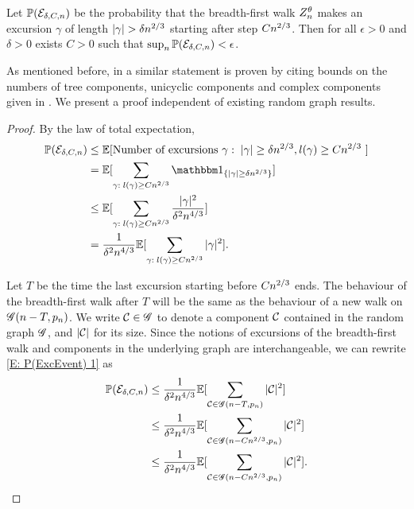 \begin{lemma} \label{L: late excursions}
	Let 
	$\mathbb{P}(\mathcal{E}_{\delta, C, n})$ 
	be the probability that the breadth-first walk $Z_n^{\theta}$ makes an excursion $\gamma$ of length 
	$|\gamma| > \delta n^{2 / 3}$ starting after step $Cn^{2 / 3}$.
	Then for all $\epsilon>0$ and $\delta > 0$ exists $C>0$ such that $\sup_n \mathbb{P}(\mathcal{E}_{\delta, C, n}) < \epsilon$. 
\end{lemma}
\begin{note}
	As mentioned before, in \cite[Lemma 9, p.826]{Aldous.1997} a similar statement is proven
	by citing bounds on the numbers of tree components, unicyclic components and complex components
	given in \cite{Luczak.1994}.
	We present a proof independent of existing random graph results.
\end{note}

\begin{proof}
	By the law of total expectation,
	\begin{equation} \label{E: P(ExcEvent) 1}
	\begin{aligned}
	\Prob(\ExcursionEvent) 
	&\leq \Exp{ \text{Number of excursions $\gamma: \; |\gamma| \geq \delta\n{2}{3},l(\gamma) \geq C\n{2}{3}$ } } \\
	&= \Exp{ \sum_{\gamma: \; l(\gamma) \geq C\n{2}{3}} \Ind{\{|\gamma| \geq \delta\n{2}{3} \} } } \\
	&\leq \Exp{ \sum_{\gamma: \; l(\gamma) \geq C\n{2}{3}} \frac{|\gamma|^2}{\delta^2\n{4}{3}} } \\
	&= \frac{1}{\delta^2\n{4}{3}} \Exp{ \sum_{\gamma: \; l(\gamma) \geq C\n{2}{3}}  |\gamma|^2 }.
	\end{aligned}
	\end{equation}
	
	Let $T$ be the time the last excursion starting before $Cn^{2 / 3}$ ends.
	The behaviour of the breadth-first walk after $T$ will be the same as the behaviour of a new walk on $\mathscr{G}(n-T, p_n)$.
	We write $\mathcal{C} \in \mathscr{G}$ to denote a component $\mathcal{C}$ contained in the random graph $\mathscr{G}$,
	and $|\mathcal{C}|$ for its size.
	Since the notions of excursions of the breadth-first walk and components in the underlying graph are interchangeable,
	we can rewrite \eqref{E: P(ExcEvent) 1} as
	\begin{equation} \label{E: P(ExcEvent) 2}
	\begin{aligned}
	\mathbb{P}(\mathcal{E}_{\delta, C, n}) 
	&\leq \frac{1}{\delta^2n^{4 / 3}} \mathbb{E}[ \sum_{\mathcal{C} \in \mathscr{G}(n-T, p_n)}  |\mathcal{C}|^2  ] \\
	&\leq \frac{1}{\delta^2n^{4 / 3}} \mathbb{E}[ \sum_{\mathcal{C} \in \mathscr{G}(n-Cn^{2 / 3}, p_n)}  |\mathcal{C}|^2  ] \\
	&\leq \frac{1}{\delta^2n^{4 / 3}} \mathbb{E}[ \sum_{\mathcal{C} \in \mathscr{G}(n-Cn^{2 / 3}, p_n)}  |\mathcal{C}|^2 ].
	\end{aligned}
	\end{equation}
	

\end{proof}

